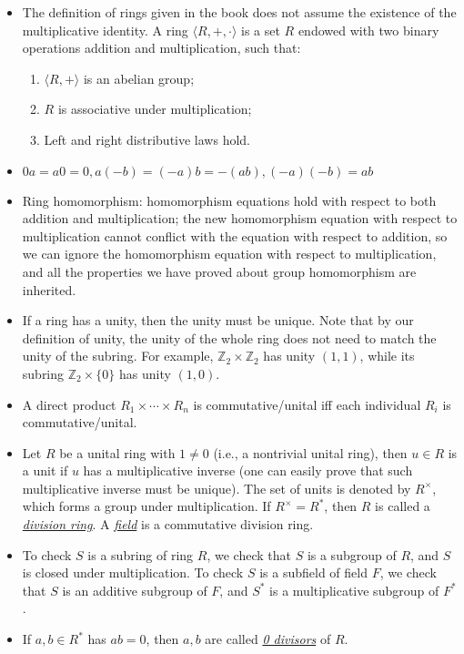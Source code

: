 \documentclass{article}
\newcommand{\df}[1]{\ul{\textit{#1}}}
\newcommand{\Z}{\mathbb{Z}}
\begin{document}
\begin{itemize}
    \item The definition of rings given in the book does not assume the existence of the multiplicative identity. A ring $\langle R,+,\cdot \rangle$ is a set $R$ endowed with two binary operations addition and multiplication, such that:
    \begin{enumerate}[label=(\alph*)]
        \item $\langle R, + \rangle$ is an abelian group;
        \item $R$ is associative under multiplication;
        \item Left and right distributive laws hold.
    \end{enumerate}
    \item $0a = a0 = 0, a(-b)=(-a)b=-(ab), (-a)(-b)=ab$
    \item Ring homomorphism: homomorphism equations hold with respect to both addition and multiplication; the new homomorphism equation with respect to multiplication cannot conflict with the equation with respect to addition, so we can ignore the homomorphism equation with respect to multiplication, and all the properties we have proved about group homomorphism are inherited.
    \item If a ring has a unity, then the unity must be unique. Note that by our definition of unity, the unity of the whole ring does not need to match the unity of the subring. For example, $\Z_2 \times \Z_2$ has unity $(1,1)$, while its subring $\Z_2 \times \{0\}$ has unity $(1,0)$.
    \item A direct product $R_1 \times \cdots \times R_n$ is commutative/unital iff each individual $R_i$ is commutative/unital.
    \item Let $R$ be a unital ring with $1 \neq 0$ (i.e., a nontrivial unital ring), then $u \in R$ is a unit if $u$ has a multiplicative inverse (one can easily prove that such multiplicative inverse must be unique). The set of units is denoted by $R^\times$, which forms a group under multiplication. If $R^\times = R^*$, then $R$ is called a \df{division ring}. A \df{field} is a commutative division ring.
    \item To check $S$ is a subring of ring $R$, we check that $S$ is a subgroup of $R$, and $S$ is closed under multiplication. To check $S$ is a subfield of field $F$, we check that $S$ is an additive subgroup of $F$, and $S^*$ is a multiplicative subgroup of $F^*$.
    \item If $a,b \in R^*$ has $ab = 0$, then $a,b$ are called \df{0 divisors} of $R$.

\end{itemize}
\end{document}
